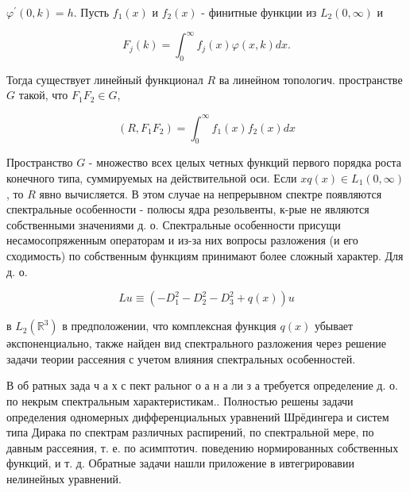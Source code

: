 \documentclass[10pt]{article}
\begin{document}
$\varphi^{\prime}(0, k)=h$. Пусть $f_{1}(x)$ и $f_{2}(x)$ - финитные функции из $L_{2}(0, \infty)$ и



\[

F_{j}(k)=\int_{0}^{\infty} f_{j}(x) \varphi(x, k) d x .

\]



Тогда существует линейный функционал $R$ ва линеӥном топологич. пространстве $G$ такой, что $F_{1} F_{2} \in G$,



\[

\left(R, F_{1} F_{2}\right)=\int_{0}^{\infty} f_{1}(x) f_{2}(x) d x

\]



Пространство $G$ - множество всех целых четных функций первого порядка роста конечного типа, суммируемых на действительной оси. Если $x q(x) \in L_{1}(0, \infty)$, то $R$ явно вычисляется. В этом случае на непрерывном спектре появляются спектральные особенности - полюсы ядра резольвенты, к-рые не являются собственными значениями д. о. Спектральные особенности присущи несамосопряженным операторам и из-за них вопросы разложения (и его сходимость) по собственным функциям принимают более сложный характер. Для д. о.



\[

L u \equiv\left(-D_{1}^{2}-D_{2}^{2}-D_{3}^{2}+q(x)\right) u

\]



в $L_{2}\left(\mathbb{R}^{3}\right)$ в предположении, что комплексная функция $q(x)$ убывает әкспоненциально, также найден вид спектрального разложения через решение задачи теории рассеяния с учетом влияния спектральных особенностей.



В об ратных зада ч а х с пект ральног о а н а ли з а требуется определение д. о. по некрым спектральным характеристикам.. Полностью решены задачи определения одномерных дифференциальных уравнений Шрёдингера и систем типа Дирака по спектрам различных распирений, по спектральной мере, по давным рассеяния, т. е. по асимптотич. поведению нормированных собственных функций, и т. д. Обратные задачи нашли приложение в ивтегрировавии нелинейных уравнений.
\end{document}
